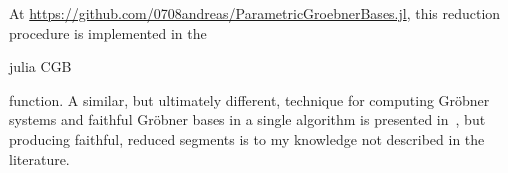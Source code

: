 \begin{remark}
  At \url{https://github.com/0708andreas/ParametricGroebnerBases.jl}, this reduction procedure is implemented in the \begin{mintinline}{julia} CGB \end{mintinline} function. A similar, but ultimately different, technique for computing Gröbner systems and faithful Gröbner bases in a single algorithm is presented in~\cite{10.1145/1993886.1993918}, but producing faithful, reduced segments is to my knowledge not described in the literature.

\end{remark}

